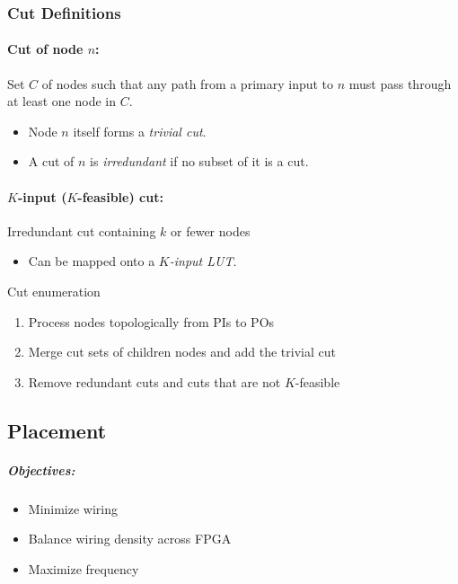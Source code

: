 \documentclass[a4paper]{article}
\begin{document}
\subsubsection{Cut Definitions}

\paragraph{Cut of node $n$:} Set $C$ of nodes such that any path from a primary input to $n$ must pass through at least one node in $C$.
\begin{itemize}
    \item Node $n$ itself forms a \emph{trivial cut}.
    \item A cut of $n$ is \emph{irredundant} if no subset of it is a cut.
\end{itemize}

\paragraph{$K$-input ($K$-feasible) cut:} Irredundant cut containing $k$ or fewer nodes
\begin{itemize}
    \item Can be mapped onto a \emph{$K$-input LUT}.
\end{itemize}

\begin{subbox}{Cut enumeration}
    \begin{enumerate}
        \item Process nodes topologically from PIs to POs
        \item Merge cut sets of children nodes and add the trivial cut
        \item Remove redundant cuts and cuts that are not $K$-feasible
    \end{enumerate}
\end{subbox}

\subsection{Placement}

\subparagraph{Objectives:}
\begin{itemize}
    \item Minimize wiring
    \item Balance wiring density across FPGA
    \item Maximize frequency
\end{itemize}
\end{document}
